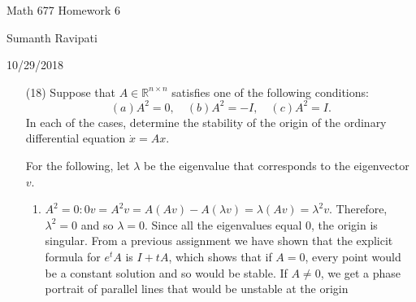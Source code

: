 \documentclass[12pt,letterpaper,reqno]{amsart}
\newcommand{\R}{\mathbb R}
\begin{document}
\thispagestyle{empty}
\centerline{\Large Math 677 Homework 6}
\centerline{Sumanth Ravipati}
\centerline{10/29/2018}
\vspace{.25in}

\begin{enumerate}
\item[(18)] Suppose that $A \in \R^{n\times n}$ satisfies one of the following conditions:
$$(a) A^2 = 0, \quad (b) A^2 = -I, \quad (c) A^2 = I.$$
In each of the cases, determine the stability of the origin of the ordinary differential equation $\dot{x} = Ax$.\newline

\begin{flushleft}
For the following, let $\lambda$ be the eigenvalue that corresponds to the eigenvector $v$.
\end{flushleft}
\begin{enumerate}
    \item $A^2 = 0 : 0v = A^2v = A(Av) - A(\lambda v) = \lambda(Av) = \lambda^2v$. Therefore, $\lambda^2 = 0$ and so $\lambda = 0$. Since all the eigenvalues equal 0, the origin is singular. From a previous assignment we have shown that the explicit formula for $e^tA$ is $I +tA$, which shows that if $A = 0$, every point would be a constant solution and so would be stable. If $A \not= 0$, we get a phase portrait of parallel lines that would be unstable at the origin \newline


\end{enumerate}
\end{enumerate}
\end{document}
